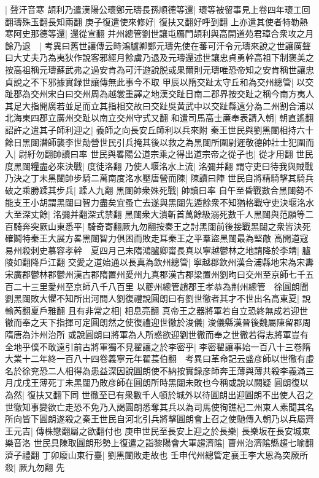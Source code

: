 |{
	聲汗音寒}
頡利乃遣漢陽公瓌鄭元璹長孫順德等還|{
	瓌等被留事見上卷四年瓌工回翻璹殊玉翻長知兩翻}
庚子復遣使來修好|{
	復扶又翻好呼到翻}
上亦遣其使者特勒熱寒阿史那德等還|{
	還從宣翻}
并州總管劉世讓屯鴈門頡利與高開道苑君璋合衆攻之月餘乃退　|{
	考異曰舊世讓傳云時鴻臚卿鄭元璹先使在蕃可汗令元璹來說之世讓厲聲曰大丈夫乃為夷狄作說客邪經月餘虜乃退及元璹還述世讓忠貞勇幹高祖下制褒美之按高祖稱元璹蘇武弗之過安肯為可汗遊說脱或果爾則元璹唯恐帝知之安肯稱世讓忠貞說之不下邪據實録世讓傳無此事今不取}
甲辰以隋交趾太守丘和為交州總管|{
	以交趾郡為交州宋白曰交州周為越裳重譯之地漢交趾日南二郡界按交趾之稱今南方夷人其足大指開廣若並足而立其指相交故曰交趾吳黄武中以交趾縣遠分為二州割合浦以北海東四郡立廣州交趾以南立交州守式又翻}
和遣司馬高士亷奉表請入朝|{
	朝直遙翻}
詔許之遣其子師利迎之|{
	義師之向長安丘師利以兵來附}
秦王世民與劉黑闥相持六十餘日黑闥潛師襲李世勣營世民引兵掩其後以救之為黑闥所圍尉遲敬德帥壯士犯圍而入|{
	尉紆勿翻帥讀曰率}
世民與畧陽公道宗乘之得出道宗帝之從子也|{
	從才用翻}
世民度黑闥糧盡必來決戰|{
	度徒洛翻}
乃使人堰洺水上流|{
	洺彌并翻}
謂守吏曰待我與賊戰乃決之丁未黑闥帥步騎二萬南度洺水壓唐營而陳|{
	陳讀曰陣}
世民自將精騎擊其騎兵破之乘勝蹂其步兵|{
	蹂人九翻}
黑闥帥衆殊死戰|{
	帥讀曰率}
自午至昏戰數合黑闥勢不能支王小胡謂黑闥曰智力盡矣宜蚤亡去遂與黑闥先遁餘衆不知猶格戰守吏決堰洺水大至深丈餘|{
	洺彌并翻深式禁翻}
黑闥衆大潰斬首萬餘級溺死數千人黑闥與范願等二百騎奔突厥山東悉平|{
	騎奇寄翻厥九勿翻按秦王之討黑闥前後接戰黑闥之衆皆決死確鬭特秦王大展方畧黑闥智力俱困而敗走耳秦王之平羣盜黑闥最為堅敵}
高開道寇易州殺刺史慕容孝幹　夏四月己未隋鴻臚卿甯長真以寧越鬱林之地請降於李靖|{
	臚陵如翻降戶江翻}
交愛之道始通以長真為欽州總管|{
	寧越郡欽州漢合浦縣地宋為宋夀宋廣郡鬱林郡鬱州漢古郡隋置州愛州九真郡漢古郡梁置州劉昫曰交州至京師七千五百二十三里愛州至京師八千八百里}
以夔州總管趙郡王孝恭為荆州總管　徐圓朗聞劉黑闥敗大懼不知所出河間人劉復禮說圓朗曰有劉世徹者其才不世出名高東夏|{
	說輸芮翻夏戶雅翻}
且有非常之相|{
	相息亮翻}
真帝王之器將軍若自立恐終無成若迎世徹而奉之天下指揮可定圓朗然之使復禮迎世徹於浚儀|{
	浚儀縣漢晉後魏屬陳留郡周隋唐為汴州治所}
或說圓朗曰將軍為人所惑欲迎劉世徹而奉之世徹若得志將軍豈有全地乎僕不敢遠引前古將軍獨不見翟讓之於李密乎|{
	李密翟讓事始一百八十三卷隋大業十二年終一百八十四卷義寧元年翟萇伯翻　考異曰革命記云盛彦師以世徹有虛名於徐兖恐二人相得為患益深因說圓朗使不納按實録彦師奔王薄與薄共殺李義滿三月戊戌王薄死丁未黑闥乃敗彦師在圓朗所時黑闥未敗也今稱或說以闕疑}
圓朗復以為然|{
	復扶又翻下同}
世徹至已有衆數千人頓於城外以待圓朗出迎圓朗不出使人召之世徹知事變欲亡走恐不免乃入謁圓朗悉奪其兵以為司馬使徇譙杞二州東人素聞其名所向皆下圓朗遂殺之秦王世民自河北引兵將擊圓朗會上召之使馳傳入朝乃以兵屬齊王元吉|{
	傳株戀翻屬之欲翻付也}
庚申世民至長安上迎之於長樂|{
	長樂坂在長安城東樂音洛}
世民具陳取圓朗形勢上復遣之詣黎陽會大軍趨濟隂|{
	曹州治濟隂縣趨七喻翻濟子禮翻}
丁卯廢山東行臺|{
	劉黑闥敗走故也}
壬申代州總管定襄王李大恩為突厥所殺|{
	厥九勿翻}
先

